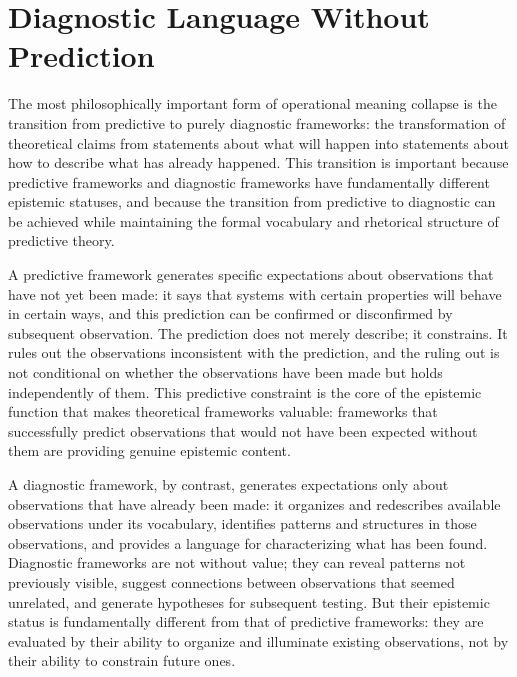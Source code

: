 \documentclass[12pt, openright, twoside]{book}
\begin{document}
\section{Diagnostic Language Without Prediction}

The most philosophically important form of operational
meaning collapse is the transition from predictive
to purely diagnostic frameworks: the transformation
of theoretical claims from statements about what will
happen into statements about how to describe what has
already happened. This transition is important because
predictive frameworks and diagnostic frameworks have
fundamentally different epistemic statuses, and because
the transition from predictive to diagnostic can be
achieved while maintaining the formal vocabulary and
rhetorical structure of predictive theory.

A predictive framework generates specific expectations
about observations that have not yet been made: it says
that systems with certain properties will behave in
certain ways, and this prediction can be confirmed or
disconfirmed by subsequent observation. The prediction
does not merely describe; it constrains. It rules out
the observations inconsistent with the prediction, and
the ruling out is not conditional on whether the
observations have been made but holds independently
of them. This predictive constraint is the core of
the epistemic function that makes theoretical frameworks
valuable: frameworks that successfully predict
observations that would not have been expected without
them are providing genuine epistemic content.

A diagnostic framework, by contrast, generates
expectations only about observations that have already
been made: it organizes and redescribes available
observations under its vocabulary, identifies patterns
and structures in those observations, and provides
a language for characterizing what has been found.
Diagnostic frameworks are not without value; they can
reveal patterns not previously visible, suggest
connections between observations that seemed unrelated,
and generate hypotheses for subsequent testing.
But their epistemic status is fundamentally different
from that of predictive frameworks: they are evaluated
by their ability to organize and illuminate existing
observations, not by their ability to constrain future
ones.
\end{document}
